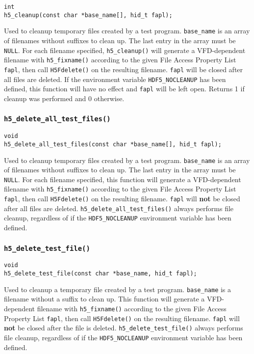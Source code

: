 \documentclass[../HDF5_RFC.tex]{subfiles}
\begin{document}
\begin{verbatim}
int
h5_cleanup(const char *base_name[], hid_t fapl);
\end{verbatim}

Used to cleanup temporary files created by a test program. \texttt{base\_name} is an array of filenames
without suffixes to clean up. The last entry in the array must be \texttt{NULL}. For each filename
specified, \texttt{h5\_cleanup()} will generate a VFD-dependent filename with \texttt{h5\_fixname()}
according to the given File Access Property List \texttt{fapl}, then call \texttt{H5Fdelete()} on the
resulting filename. \texttt{fapl} will be closed after all files are deleted. If the environment variable
\texttt{HDF5\_NOCLEANUP} has been defined, this function will have no effect and \texttt{fapl} will be
left open. Returns 1 if cleanup was performed and 0 otherwise.

\subsubsection{\texttt{h5\_delete\_all\_test\_files()}}

\begin{verbatim}
void
h5_delete_all_test_files(const char *base_name[], hid_t fapl);
\end{verbatim}

Used to cleanup temporary files created by a test program. \texttt{base\_name} is an array of filenames
without suffixes to clean up. The last entry in the array must be \texttt{NULL}. For each filename
specified, this function will generate a VFD-dependent filename with \texttt{h5\_fixname()} according to
the given File Access Property List \texttt{fapl}, then call \texttt{H5Fdelete()} on the resulting filename.
\texttt{fapl} will \textbf{not} be closed after all files are deleted. \texttt{h5\_delete\_all\_test\_files()}
always performs file cleanup, regardless of if the \texttt{HDF5\_NOCLEANUP} environment variable has been defined.

\subsubsection{\texttt{h5\_delete\_test\_file()}}

\begin{verbatim}
void
h5_delete_test_file(const char *base_name, hid_t fapl);
\end{verbatim}

Used to cleanup a temporary file created by a test program. \texttt{base\_name} is a filename without a
suffix to clean up. This function will generate a VFD-dependent filename with \texttt{h5\_fixname()}
according to the given File Access Property List \texttt{fapl}, then call \texttt{H5Fdelete()} on the resulting
filename. \texttt{fapl} will \textbf{not} be closed after the file is deleted.
\texttt{h5\_delete\_test\_file()} always performs file cleanup, regardless of if the
\texttt{HDF5\_NOCLEANUP} environment variable has been defined.
\end{document}
